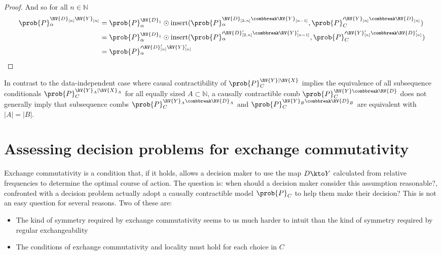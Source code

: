 \begin{proof}
And so for all $n\in \mathbb{N}$
\begin{align}
    \prob{P}_\alpha^{\RV{D}_{[n]} \RV{Y}_{[n]}} &=  \prob{P}_\alpha^{\RV{D}_1}\odot \text{insert}(\prob{P}_\alpha^{ \RV{D}_{[2,n]}\combbreak\RV{Y}_{[n-1]}}, \prob{P}_C^{\prime \RV{Y}_{[n]}\combbreak\RV{D}_{[n]}}) \\
    &= \prob{P}_\alpha^{\RV{D}_1}\odot \text{insert}(\prob{P}_\alpha^{\prime \RV{D}'_{[2,n]}\combbreak\RV{Y}'_{[n-1]}}, \prob{P}_C^{\prime \RV{Y}'_{[n]}\combbreak\RV{D}'_{[n]}}) \\
    &= \prob{P}_\alpha^{\prime\RV{D}'_{[n]} \RV{Y}'_{[n]}}
\end{align}
\end{proof}

In contrast to the data-independent case where causal contractibility of $\prob{P}_C^{\RV{Y}|\RV{X}}$ implies the equivalence of all subsequence conditionals $\prob{P}_C^{\RV{Y}_A|\RV{X}_A}$ for all equally sized $A\subset\mathbb{N}$, a causally contractible comb $\prob{P}_C^{\RV{Y}\combbreak \RV{D}}$ does not generally imply that subsequence combs $\prob{P}_C^{\RV{Y}_A\combbreak \RV{D}_A}$ and $\prob{P}_C^{\RV{Y}_B\combbreak \RV{D}_B}$ are equivalent with $|A|=|B|$.



\section{Assessing decision problems for exchange commutativity}

Exchange commutativity is a condition that, if it holds, allows a decision maker to use the map $D\kto Y$ calculated from relative frequencies to determine the optimal course of action. The question is: when should a decision maker consider this assumption reasonable?, confronted with a decision problem actually adopt a causally contractible model $\prob{P}_C$ to help them make their decision? This is not an easy question for several reasons. Two of these are:
\begin{itemize}
    \item The kind of symmetry required by exchange commutativity seems to us much harder to intuit than the kind of symmetry required by regular exchangeability
    \item The conditions of exchange commutativity and locality must hold for each choice in $C$
\end{itemize}


